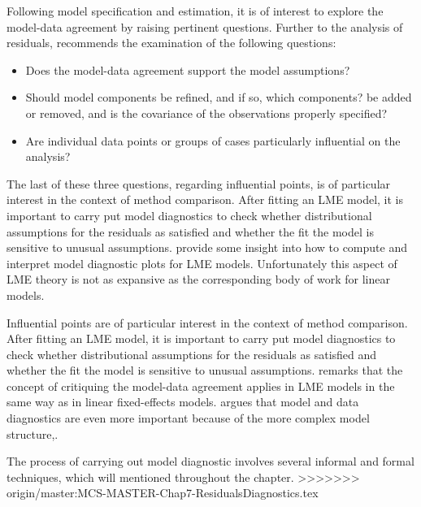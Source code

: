 \documentclass[12pt, a4paper]{report}
\theoremstyle{plain}
\theoremstyle{definition}
\theoremstyle{remark}
\begin{document}
Following model specification and estimation, it is of interest to explore the model-data agreement by raising pertinent questions.  Further to the analysis of residuals, \citet{schabenberger} recommends the examination of the following questions:
\newpage
	\begin{itemize}
		\item Does the model-data agreement support the model assumptions?
		\item Should model components be refined, and if so, which components? %
		be added or removed, and is the covariance of the observations properly specified?
		\item Are individual data points or groups of cases particularly
		influential on the analysis?
	\end{itemize}
\newpage
	
	The last of these three questions, regarding influential points, is of particular interest in the context of method comparison. After fitting an LME model, it is important to carry put model diagnostics to check whether distributional assumptions for the
	residuals as satisfied and whether the fit the model is sensitive to unusual assumptions.
\newpage
\citet{PB} provide some insight into how to compute and interpret model diagnostic plots for LME models. Unfortunately this aspect of LME theory is not as expansive as the corresponding body of work for linear models.

Influential points are of particular interest in the context of method comparison. After fitting an LME model, it is important to carry put model diagnostics to check whether distributional assumptions for the residuals as satisfied and whether the fit the model is sensitive to unusual assumptions. \citet{schabenberger} remarks that the concept of critiquing the model-data agreement applies in LME models in the same way as in linear fixed-effects models. \citep{west} argues that model and data diagnostics are even more important because of the more complex model structure,.

The process of carrying out model diagnostic involves several informal and formal techniques, which will mentioned throughout the chapter.
>>>>>>> origin/master:MCS-MASTER-Chap7-ResidualsDiagnostics.tex



\end{document}
